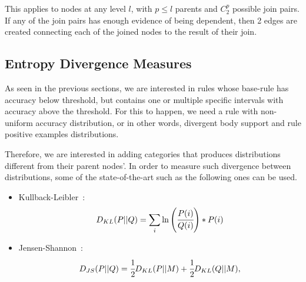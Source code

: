 This applies to nodes at any level $l$, with $p \leq l$ parents and $C_{2}^{p}$ possible join pairs. If any of the
join
pairs has enough evidence of being dependent, then 2 edges are created connecting each of the joined
nodes to the result of their join.

\subsection{Entropy Divergence Measures}

As seen in the previous sections, we are interested in rules whose base-rule has accuracy below threshold, but
contains one or multiple specific intervals with accuracy above the threshold. For this to happen, we need a rule with
non-uniform accuracy distribution, or in other words, divergent body support and rule positive examples distributions.

Therefore, we are interested in adding categories that produces distributions different from their parent nodes'. In
order to measure such divergence between distributions, some of the state-of-the-art such as the following ones can be
used.

\begin{itemize}
 \item Kullback-Leibler~\cite{Kullback51klDivergence}: 
    \begin{equation}
      D_{KL}(P||Q)=\sum_{\substack{i}}\ln\left(\cfrac{P(i)}{Q(i)}\right)*P(i)
    \end{equation}
 \item Jensen-Shannon~\cite{17795}:
    \begin{equation}
      D_{JS}(P||Q)=\cfrac{1}{2}D_{KL}(P||M)+\cfrac{1}{2}D_{KL}(Q||M), 
    \end{equation}
\end{itemize}

